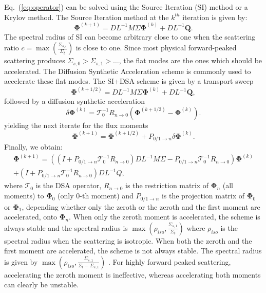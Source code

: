 \documentclass[preprint,10pt]{elsarticle}
\newcommand\bs{\boldsymbol}
\renewcommand{\(}{\left(}
\renewcommand{\)}{\right)}
\renewcommand{\[}{\left[}
\renewcommand{\]}{\right]}
\newcommand{\eqt}[1]{Eq.~(\ref{#1})}                     %
\begin{document}
\eqt{eq:operator} can be solved using the Source Iteration (SI) method or a
Krylov method. The Source Iteration method at the $k^{th}$ iteration is given
by:
%
\begin{equation}
\bs{\Phi}^{(k+1)} = DL^{-1}M\Sigma \bs{\Phi}^{(k)} + DL^{-1}\bs{Q} .
\end{equation}
%
The spectral radius of SI can become arbitrary close to one when the
scattering ratio $c=\max\(\frac{\Sigma_{s,l}}{\Sigma_t}\)$ is close to one.
Since most physical forward-peaked scattering produces
$\Sigma_{s,0}>\Sigma_{s,1}>\hdots$, the flat modes are the ones which should
be accelerated. The Diffusion Synthetic Acceleration scheme \cite{adams} is
commonly used to accelerate these flat modes. The SI+DSA scheme is given by
%
a transport sweep
\begin{equation}
\bs{\Phi}^{(k+1/2)} = DL^{-1}M\Sigma\bs{\Phi}^{(k)} + DL^{-1}\bs{Q},
\end{equation}
%
followed by a diffusion synthetic acceleration
%
\begin{equation}
\delta\bs{\Phi}^{(k)} = \mathcal{T}_0^{-1} R_{n\rightarrow 0} 
\(\bs{\Phi}^{(k+1/2)}-\bs{\Phi}^{(k)}\) .
\end{equation}
%
yielding the next iterate for the flux moments
%
\begin{equation}
\bs{\Phi}^{(k+1)} = \bs{\Phi}^{(k+1/2)} + P_{0/1 \rightarrow n} \delta 
\bs{\Phi}^{(k)} .
\end{equation}
%
Finally, we obtain:
%
\begin{multline}
\bs{\Phi}^{(k+1)} = \((I+P_{0/1\rightarrow n} \mathcal{T}_0^{-1} R_{n\rightarrow 0} )
DL^{-1}M\Sigma-P_{0/1\rightarrow n}\mathcal{T}_0^{-1} R_{n\rightarrow 0}\)
\bs{\Phi}^{(k)}\\ + (I+P_{0/1\rightarrow n}\mathcal{T}_0^{-1}
R_{n\rightarrow 0})DL^{-1} Q ,
\end{multline}
%
where $\mathcal{T}_0$ is the DSA operator, $R_{n\rightarrow 0}$ is the
restriction matrix of $\bs{\Phi}_{n}$ (all moments) to $\bs{\Phi}_0$ (only 0-th moment) and $P_{0/1 \rightarrow
n}$ is the projection matrix of $\bs{\Phi}_0$ or $\bs{\Phi}_1$, depending
whether only the zeroth or the zeroth and the first moment are accelerated, onto
$\bs{\Phi}_n$. When only the zeroth moment is accelerated, the scheme is always
stable and the spectral radius is
$\max\(\rho_{iso},\frac{\Sigma_{s,1}}{\Sigma_t}\)$ where $\rho_{iso}$ is the
spectral radius when the scattering is isotropic. When both the zeroth and the
first moment are accelerated, the scheme is not always stable. The spectral
radius is given by
$\max\(\rho_{iso},\frac{\Sigma_{s,1}}{\Sigma_t-\Sigma_{s,1}}\)$
\cite{multisweep}. For highly forward peaked scattering, accelerating the zeroth moment 
is ineffective, whereas accelerating both moments can clearly be unstable.
\end{document}
